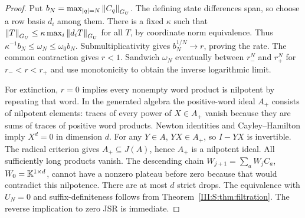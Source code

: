 \begin{proof}
Put $b_N=\max_{|q|=N}\left\lVert C_q\right\rVert_{G_U}$. The defining state differences span, so choose a row basis $d_i$ among them. There is a fixed $\kappa$ such that $\left\lVert T\right\rVert_{G_U}\le\kappa\max_i\left\lVert d_iT\right\rVert_{G_U}$ for all $T$, by coordinate norm equivalence. Thus
$\kappa^{-1}b_N\le\omega_N\le\omega_0b_N$. Submultiplicativity gives $b_N^{1/N}\to r$, proving the rate. The common contraction gives $r<1$. Sandwich $\omega_N$ eventually between $r_-^N$ and $r_+^N$ for $r_-<r<r_+$ and use monotonicity to obtain the inverse logarithmic limit.

For extinction, $r=0$ implies every nonempty word product is nilpotent by repeating that word. In the generated algebra the positive-word ideal $A_+$ consists of nilpotent elements: traces of every power of $X\in A_+$ vanish because they are sums of traces of positive word products. Newton identities and Cayley--Hamilton imply $X^d=0$ in dimension $d$. For any $Y\in A$, $YX\in A_+$, so $I-YX$ is invertible. The radical criterion gives $A_+\subseteq J(A)$, hence $A_+$ is a nilpotent ideal. All sufficiently long products vanish. The descending chain $W_{j+1}=\sum_aW_jC_a$, $W_0=\mathbb K^{1\times d}$, cannot have a nonzero plateau before zero because that would contradict this nilpotence. There are at most $d$ strict drops. The equivalence with $U_N=0$ and suffix-definiteness follows from Theorem~\ref{III:S:thm:filtration}. The reverse implication to zero JSR is immediate.
\end{proof}
